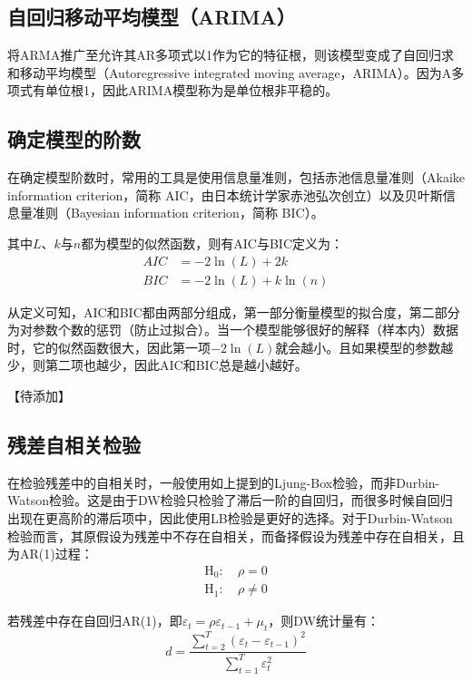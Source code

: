 \documentclass[11pt]{article}
\begin{document}
\subsection{自回归移动平均模型（ARIMA）}

将ARMA推广至允许其AR多项式以1作为它的特征根，则该模型变成了自回归求和移动平均模型（Autoregressive integrated moving average，ARIMA）。因为A多项式有单位根1，因此ARIMA模型称为是单位根非平稳的。

\subsection{确定模型的阶数}

在确定模型阶数时，常用的工具是使用信息量准则，包括赤池信息量准则（Akaike information criterion，简称 AIC，由日本统计学家赤池弘次创立）以及贝叶斯信息量准则（Bayesian information criterion，简称 BIC）。

其中$L$、$k$与$n$都为模型的似然函数，则有AIC与BIC定义为：
\begin{align*}
    AIC &= -2 \ln(L) + 2k \\
    BIC &= -2 \ln(L) + k\ln(n)
\end{align*}

从定义可知，AIC和BIC都由两部分组成，第一部分衡量模型的拟合度，第二部分为对参数个数的惩罚（防止过拟合）。当一个模型能够很好的解释（样本内）数据时，它的似然函数很大，因此第一项$-2\ln(L)$就会越小。且如果模型的参数越少，则第二项也越少，因此AIC和BIC总是越小越好。

【待添加】

\subsection{残差自相关检验}

在检验残差中的自相关时，一般使用如上提到的Ljung-Box检验，而非Durbin-Watson检验。这是由于DW检验只检验了滞后一阶的自回归，而很多时候自回归出现在更高阶的滞后项中，因此使用LB检验是更好的选择。对于Durbin-Watson检验而言，其原假设为残差中不存在自相关，而备择假设为残差中存在自相关，且为AR(1)过程：
\begin{align*}
    \text{H}_0: \ & \rho = 0 \\
    \text{H}_1: \ & \rho \neq 0
\end{align*}

若残差中存在自回归AR(1)，即$\varepsilon_t = \rho \varepsilon_{t-1} + \mu_t$，则DW统计量有：
\begin{equation*}
    d = \frac{\sum_{t=2}^{T} (\varepsilon_t - \varepsilon_{t-1})^2}{\sum_{t=1}^{T} \varepsilon^2_t}
\end{equation*}
\end{document}
